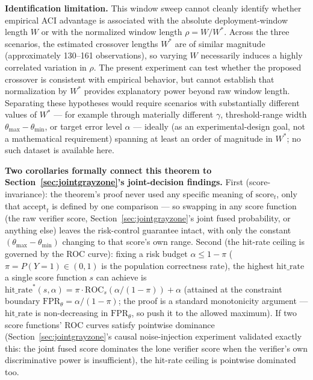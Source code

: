 \documentclass[11pt]{article}
\begin{document}
\textbf{Identification limitation.} This window sweep cannot cleanly identify whether empirical ACI advantage is associated with the absolute deployment-window length $W$ or with the normalized window length $\rho = W/W^*$. Across the three scenarios, the estimated crossover lengths $W^*$ are of similar magnitude (approximately 130--161 observations), so varying $W$ necessarily induces a highly correlated variation in $\rho$. The present experiment can test whether the proposed crossover is consistent with empirical behavior, but cannot establish that normalization by $W^*$ provides explanatory power beyond raw window length. Separating these hypotheses would require scenarios with substantially different values of $W^*$ --- for example through materially different $\gamma$, threshold-range width $\theta_{\max}-\theta_{\min}$, or target error level $\alpha$ --- ideally (as an experimental-design goal, not a mathematical requirement) spanning at least an order of magnitude in $W^*$; no such dataset is available here.

\textbf{Two corollaries formally connect this theorem to Section~\ref{sec:jointgrayzone}'s joint-decision findings.} First (score-invariance): the theorem's proof never used any specific meaning of $\text{score}_t$, only that $\text{accept}_t$ is defined by one comparison --- so swapping in any score function (the raw verifier score, Section~\ref{sec:jointgrayzone}'s joint fused probability, or anything else) leaves the risk-control guarantee intact, with only the constant $(\theta_{\max}-\theta_{\min})$ changing to that score's own range. Second (the hit-rate ceiling is governed by the ROC curve): fixing a risk budget $\alpha \le 1-\pi$ ($\pi = P(Y=1) \in (0,1)$ is the population correctness rate), the highest $\text{hit\_rate}$ a single score function $s$ can achieve is $\text{hit\_rate}^*(s,\alpha) = \pi \cdot \text{ROC}_s(\alpha/(1-\pi)) + \alpha$ (attained at the constraint boundary $\text{FPR}_\theta = \alpha/(1-\pi)$; the proof is a standard monotonicity argument --- $\text{hit\_rate}$ is non-decreasing in $\text{FPR}_\theta$, so push it to the allowed maximum). If two score functions' ROC curves satisfy pointwise dominance (Section~\ref{sec:jointgrayzone}'s causal noise-injection experiment validated exactly this: the joint fused score dominates the lone verifier score when the verifier's own discriminative power is insufficient), the hit-rate ceiling is pointwise dominated too.
\end{document}
